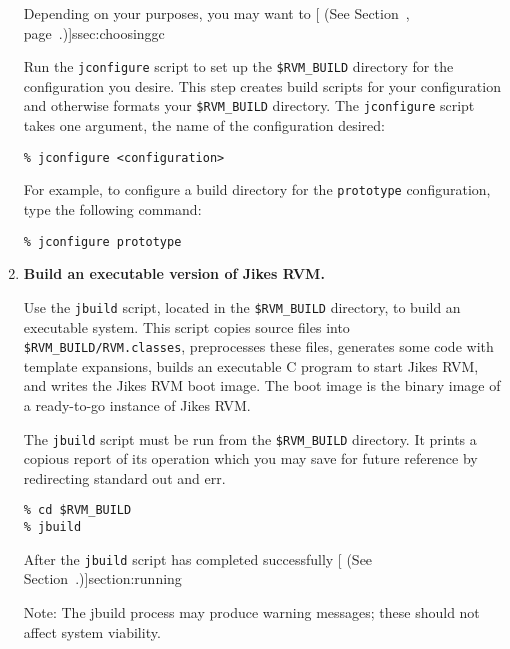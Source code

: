 \begin{enumerate}
Depending on your purposes, you may want to [ (See
Section~\Ref{}, page~\Pageref.)]{ssec:choosinggc}

Run the \texttt{jconfigure} script to set up the \texttt{\$RVM\_BUILD}
directory for the configuration you desire.  This step creates
build scripts for your configuration and otherwise formats your
\texttt{\$RVM\_BUILD} directory.
The \texttt{jconfigure} script takes one argument, the name of the
configuration desired: 

\begin{verbatim}
% jconfigure <configuration>
\end{verbatim}

For example, to configure a build directory for the 
\texttt{prototype} configuration, type the following command:

\begin{verbatim}
% jconfigure prototype
\end{verbatim}

%
%
%
\item {\bf Build an executable version of Jikes RVM.}  

Use the \texttt{jbuild} script, located in the \texttt{\$RVM\_BUILD} directory,
to build an executable system.  This script copies source files into
\texttt{\$RVM\_BUILD/RVM.classes}, preprocesses these files, generates
some code with template expansions, builds an executable C program to
start Jikes RVM, and writes the Jikes RVM boot image.  The boot
image is the binary image of a ready-to-go instance of Jikes RVM.

The \texttt{jbuild} script must be run from the \texttt{\$RVM\_BUILD}
directory. It prints a copious report of its operation which you may
save for future reference by redirecting standard out and err.

\begin{verbatim}
% cd $RVM_BUILD
% jbuild
\end{verbatim}


After the \texttt{jbuild} script has completed successfully [  (See Section~\Ref{}.)]{section:running}

Note: The jbuild process may produce warning messages; these should not
affect system viability.

\end{enumerate}

